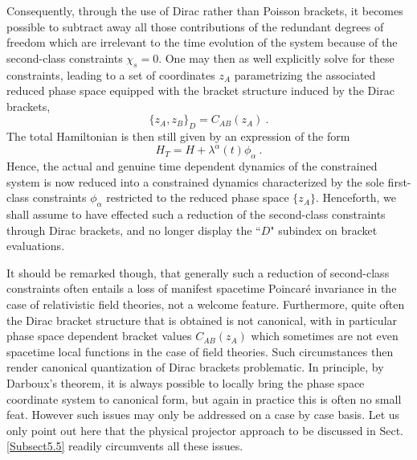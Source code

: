 \documentclass[a4paper,11pt]{article}
\begin{document}
Consequently, through the use of Dirac rather than Poisson brackets,
it becomes possible to subtract away all those contributions of the
redundant degrees of freedom which are irrelevant to the time evolution
of the system because of the second-class constraints $\chi_s=0$.
One may then as well explicitly solve for these constraints, leading
to a set of coordinates $z_A$ parametrizing the associated reduced phase 
space equipped with the bracket structure induced by the Dirac brackets,
\begin{equation}
\{z_A,z_B\}_D=C_{AB}(z_A)\ .
\end{equation}
The total Hamiltonian is then still given by an expression of the form
\begin{equation}
H_T=H+\lambda^\alpha(t)\phi_\alpha\ .
\end{equation}
Hence, the actual and genuine time dependent dynamics of the constrained
system is now reduced into a constrained dynamics characterized by the sole
first-class constraints $\phi_\alpha$ restricted to the reduced phase space 
$\{z_A\}$. Henceforth, we shall assume to have effected such a reduction
of the second-class constraints through Dirac brackets, and no longer display
the ``$D$" subindex on bracket evaluations.

It should be remarked though, that generally such a reduction of second-class
constraints often entails a loss of manifest spacetime Poincar\'e invariance
in the case of relativistic field theories, not a welcome feature.
Furthermore, quite often the Dirac bracket structure that is obtained is
not canonical, with in particular phase space dependent bracket values
$C_{AB}(z_A)$ which sometimes are not even spacetime local functions
in the case of field theories. Such circumstances then render
canonical quantization of Dirac brackets problematic. In principle, by
Darboux's theorem, it is always possible to locally bring the phase space
coordinate system to canonical form, but again in practice this is often no
small feat. However such issues may only be addressed on a case by case
basis. Let us only point out here that the physical projector approach
to be discussed in Sect.\ref{Subsect5.5} readily circumvents all these issues.
\end{document}
